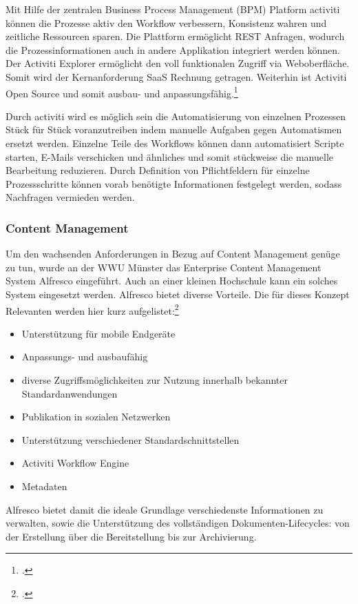 Mit Hilfe der zentralen Business Process Management (BPM) Platform activiti können die Prozesse aktiv den Workflow verbessern, Konsistenz wahren und zeitliche Ressourcen sparen.  Die Plattform ermöglicht REST Anfragen, wodurch die Prozessinformationen auch in andere Applikation integriert werden können. Der Activiti Explorer ermöglicht den voll funktionalen Zugriff via Weboberfläche. Somit wird der Kernanforderung SaaS Rechnung getragen. Weiterhin ist Activiti Open Source und somit ausbau- und anpassungsfähig.\footcite{activiti_website}

Durch activiti wird es möglich sein die Automatisierung von einzelnen Prozessen Stück für Stück voranzutreiben indem manuelle Aufgaben gegen Automatismen ersetzt werden. Einzelne Teile des Workflows können dann automatisiert Scripte starten, E-Mails verschicken und ähnliches und somit stückweise die manuelle Bearbeitung reduzieren. Durch Definition von Pflichtfeldern für einzelne Prozessschritte können vorab benötigte Informationen festgelegt werden, sodass Nachfragen vermieden werden.

\subsubsection{Content Management}
Um den wachsenden Anforderungen in Bezug auf Content Management genüge zu tun, wurde an der WWU Münster das Enterprise Content Management System Alfresco eingeführt. Auch an einer kleinen Hochschule kann ein solches System eingesetzt werden. Alfresco bietet diverse Vorteile. Die für dieses Konzept Relevanten werden hier kurz aufgelistet:\footcite[Vgl.][47 ff.]{kloetgen_2012}

\begin{itemize}
	\item Unterstützung für mobile Endgeräte
	\item Anpassungs- und ausbaufähig
	\item diverse Zugriffsmöglichkeiten zur Nutzung innerhalb bekannter Standardanwendungen
	\item Publikation in sozialen Netzwerken
	\item Unterstützung verschiedener Standardschnittstellen
	\item Activiti Workflow Engine
	\item Metadaten
\end{itemize}

Alfresco bietet damit die ideale Grundlage verschiedenste Informationen zu verwalten, sowie die Unterstützung des vollständigen Dokumenten-Lifecycles: von der Erstellung über die Bereitstellung bis zur Archivierung.

